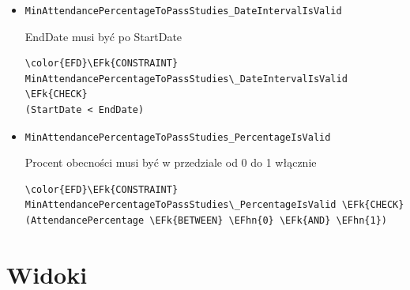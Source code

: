 \documentclass[11pt]{article}
\newcommand{\EFk}[1]{\textcolor{EFk}{\textbf{#1}}} %
\newcommand{\EFhn}[1]{\textcolor{EFhn}{#1}} %
\begin{document}
\begin{itemize}
\item \texttt{MinAttendancePercentageToPassStudies\_DateIntervalIsValid}

EndDate musi być po StartDate
\begin{Code}
\begin{Verbatim}
\color{EFD}\EFk{CONSTRAINT} MinAttendancePercentageToPassStudies\_DateIntervalIsValid \EFk{CHECK}
(StartDate < EndDate)
\end{Verbatim}
\end{Code}
\item \texttt{MinAttendancePercentageToPassStudies\_PercentageIsValid}

Procent obecności musi być w przedziale od 0 do 1 włącznie
\begin{Code}
\begin{Verbatim}
\color{EFD}\EFk{CONSTRAINT} MinAttendancePercentageToPassStudies\_PercentageIsValid \EFk{CHECK}
(AttendancePercentage \EFk{BETWEEN} \EFhn{0} \EFk{AND} \EFhn{1})
\end{Verbatim}
\end{Code}
\end{itemize}
\section{Widoki}
\label{sec:org8ba2678}
\end{document}
